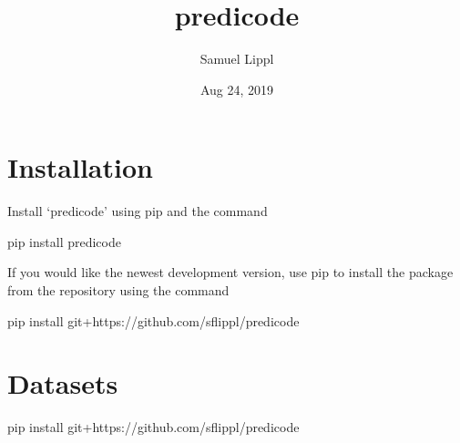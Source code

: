 \documentclass[letterpaper,10pt,english]{sphinxmanual}
\title{predicode}
\date{Aug 24, 2019}
\author{Samuel Lippl}
\begin{document}
\pagestyle{empty}
\sphinxmaketitle
\pagestyle{plain}
\sphinxtableofcontents
\pagestyle{normal}
\label{\detokenize{index::doc}}



\chapter{Installation}
\label{\detokenize{usage/installation:Installation}}\label{\detokenize{usage/installation::doc}}
Install ‘predicode’ using pip and the command

\begin{sphinxVerbatim}[commandchars=\\\{\}]
pip install predicode
\end{sphinxVerbatim}

If you would like the newest development version, use pip to install the package from the  repository using the command

\begin{sphinxVerbatim}[commandchars=\\\{\}]
pip install git+https://github.com/sflippl/predicode
\end{sphinxVerbatim}


\chapter{Datasets}
\label{\detokenize{usage/datasets:Datasets}}\label{\detokenize{usage/datasets::doc}}

{
\begin{sphinxVerbatim}[commandchars=\\\{\}]
\llap{\color{nbsphinxin}[1]:\,\hspace{\fboxrule}\hspace{\fboxsep}}
       
    pip install git+https://github.com/sflippl/predicode
       
\end{sphinxVerbatim}
}
\end{document}
